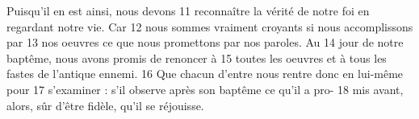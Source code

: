 Puisqu'il en est ainsi, nous devons	 
11	 	reconnaître la vérité de notre foi en regardant notre vie. Car	 
12	 	nous sommes vraiment croyants si nous accomplissons par	 
13	 	nos oeuvres ce que nous promettons par nos paroles. Au	 
14	 	jour de notre baptême, nous avons promis de renoncer à	 
15	 	toutes les oeuvres et à tous les fastes de l'antique ennemi.	 
16	 	Que chacun d'entre nous rentre donc en lui-même pour	 
17	 	s'examiner : s'il observe après son baptême ce qu'il a pro-	 
18	 	mis avant, alors, sûr d'être fidèle, qu'il se réjouisse.